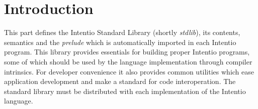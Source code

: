 \chapter{Introduction}

This part defines the Intentio Standard Library (shortly \emph{stdlib}), its contents, semantics and the \emph{prelude} which is automatically imported in each Intentio program. This library provides essentials for building proper Intentio programs, some of which should be used by the language implementation through compiler intrinsics. For developer convenience it also provides common utilities which ease application development and make a standard for code interoperation. The standard library must be distributed with each implementation of the Intentio language.
